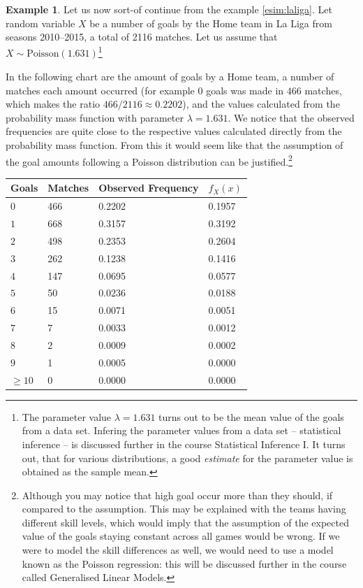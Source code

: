 \documentclass[12pt,a4paper,leqno]{report}
\theoremstyle{plain}
\theoremstyle{definition}
\newtheorem{esim}[equation]{Example}
\begin{document}
\begin{esim}
Let us now sort-of continue from the example \ref{esim:laliga}. Let random variable $X$ be a number of goals by the Home team in La Liga from seasons 2010--2015, a total of 2116 matches. Let us assume that $X\sim \text{Poisson}(1.631)$\footnote{The parameter value $\lambda = 1.631$ turns out to be the mean value of the goals from a data set. Infering the parameter values from a data set -- statistical inference -- is discussed further in the course Statistical Inference I. It turns out, that for various distributions, a good \emph{estimate} for the parameter value is obtained as the sample mean.} 

In the following chart are the amount of goals by a Home team, a number of matches each amount occurred (for example 0 goals was made in $466$ matches, which makes the ratio $466/2116 \approx 0.2202$), and the values calculated from the probability mass function with parameter $\lambda = 1.631$. We notice that the observed frequencies are quite close to the respective values calculated directly from the probability mass function. From this it would seem like that the assumption of the goal amounts following a Poisson distribution can be justified.\footnote{Although you may notice that high goal occur more than they should, if compared to the assumption. This may be explained with the teams having different skill levels, which would imply that the assumption of the expected value of the goals staying constant across all games would be wrong. If we were to model the skill differences as well, we would need to use a model known as the Poisson regression: this will be discussed further in the course called Generalised Linear Models.} 

\bigskip

\begin{tabular}{l l l L{6cm}}
\toprule
 Goals & Matches & Observed Frequency & $f_X(x)$\\
\midrule
$0$ & 466 & 0.2202 & 0.1957 \\
$1$ & 668 & 0.3157 & 0.3192\\
$2$ & 498 & 0.2353 & 0.2604\\
$3$ & 262 & 0.1238 & 0.1416\\
$4$ & 147 & 0.0695 & 0.0577\\
$5$ & 50 &  0.0236 & 0.0188\\
$6$ & 15 & 0.0071 & 0.0051\\
$7$ &  7& 0.0033 & 0.0012\\
$8$ &  2& 0.0009 & 0.0002\\
$9$ &  1& 0.0005 & 0.0000\\
$\geq 10$ & 0 & 0.0000 & 0.0000 \\
\bottomrule 
\end{tabular}


\end{esim}
\end{document}
